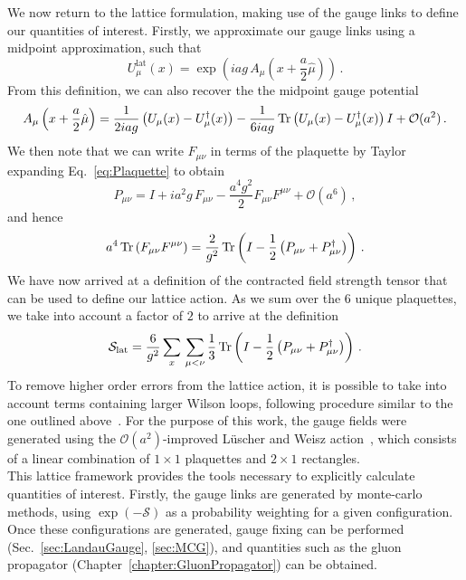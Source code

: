 We now return to the lattice formulation, making use of the gauge links to define our quantities of interest. Firstly, we approximate our gauge links using a midpoint approximation, such that
\begin{equation}
U_\mu^\text{lat}(x) = \exp\left(iag\, A_\mu\left(x+\frac{a}{2}\hat{\mu}\right)\right)\, .
\label{eq:GaugeLinkLat}
\end{equation}
From this definition, we can also recover the the midpoint gauge potential~\cite{Leinweber:1998im,Alles:1996ka}
\begin{equation}
A_\mu\left(x+\frac{a}{2}\hat{\mu}\right) = \frac{1}{2iag}\left(U_\mu(x) - U_\mu^\dag(x)\right) - \frac{1}{6iag}\operatorname{Tr}\left(U_\mu(x) - U_\mu^\dag(x)\right)I + \mathcal{O}(a^2)\, .
\label{eq:GaugePotentialLat}
\end{equation}
We then note that we can write $F_{\mu\nu}$ in terms of the plaquette by Taylor expanding Eq.~\ref{eq:Plaquette} to obtain~\cite{Gupta:1997nd}
%
\begin{equation}
P_{\mu\nu} = I+ia^2g\, F_{\mu\nu} - \frac{a^4 g^2}{2}F_{\mu\nu}F^{\mu\nu} +\mathcal{O}(a^6)\, ,
\end{equation} 
%
and hence
%
\begin{align}
a^4\operatorname{Tr}\left(F_{\mu\nu}F^{\mu\nu}\right) = \frac{2}{g^2}\operatorname{Tr}\left(I-\frac{1}{2}\left(P_{\mu\nu}+P_{\mu\nu}^\dag\right)\right)\, .
\end{align}
%
We have now arrived at a definition of the contracted field strength tensor that can be used to define our lattice action. As we sum over the 6 unique plaquettes, we take into account a factor of $2$ to arrive at the definition 
%
\begin{equation}
\mathcal{S}_\text{lat} = \frac{6}{g^2}\sum_x\,\sum_{\mu<\nu} \frac{1}{3}\operatorname{Tr}\left(I-\frac{1}{2}\left(P_{\mu\nu}+P_{\mu\nu}^\dag\right)\right)\, .
\end{equation}
%
To remove higher order errors from the lattice action, it is possible to take into account terms containing larger Wilson loops, following procedure similar to the one outlined above~\cite{Alford:1995hw,Symanzik:1983dc,Symanzik:1983gh}. For the purpose of this work, the gauge fields were generated using the $\mathcal{O}(a^2)$-improved L\"uscher and Weisz action~\cite{Luscher:1984xn}, which consists of a linear combination of $1\times 1$ plaquettes and $2\times 1$ rectangles.\\

This lattice framework provides the tools necessary to explicitly calculate quantities of interest. Firstly, the gauge links are generated by monte-carlo methods, using $\exp\left(-\mathcal{S}\right)$ as a probability weighting for a given configuration. Once these configurations are generated, gauge fixing can be performed (Sec.~\ref{sec:LandauGauge}, \ref{sec:MCG}), and quantities such as the gluon propagator (Chapter~\ref{chapter:GluonPropagator}) can be obtained.

